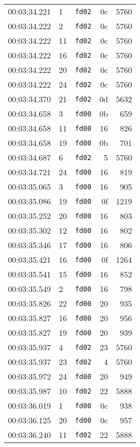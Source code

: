 \documentclass{article}
\begin{document}
\begin{longtable}{lllrr}
00:03:34.221 & 1 & \texttt{fd02} & 0c & 5760 \\
00:03:34.222 & 2 & \texttt{fd02} & 0c & 5760 \\
00:03:34.222 & 11 & \texttt{fd02} & 0c & 5760 \\
00:03:34.222 & 16 & \texttt{fd02} & 0c & 5760 \\
00:03:34.222 & 20 & \texttt{fd02} & 0c & 5760 \\
00:03:34.222 & 24 & \texttt{fd02} & 0c & 5760 \\
00:03:34.370 & 21 & \texttt{fd02} & 0d & 5632 \\
00:03:34.658 & 3 & \texttt{fd00} & 0b & 659 \\
00:03:34.658 & 11 & \texttt{fd00} & 16 & 826 \\
00:03:34.658 & 19 & \texttt{fd00} & 0b & 701 \\
00:03:34.687 & 6 & \texttt{fd02} & 5 & 5760 \\
00:03:34.721 & 24 & \texttt{fd00} & 16 & 819 \\
00:03:35.065 & 3 & \texttt{fd00} & 16 & 905 \\
00:03:35.086 & 19 & \texttt{fd00} & 0f & 1219 \\
00:03:35.252 & 20 & \texttt{fd00} & 16 & 803 \\
00:03:35.302 & 12 & \texttt{fd00} & 16 & 802 \\
00:03:35.346 & 17 & \texttt{fd00} & 16 & 806 \\
00:03:35.421 & 16 & \texttt{fd00} & 0f & 1264 \\
00:03:35.541 & 15 & \texttt{fd00} & 16 & 852 \\
00:03:35.549 & 2 & \texttt{fd00} & 16 & 798 \\
00:03:35.826 & 22 & \texttt{fd00} & 20 & 935 \\
00:03:35.827 & 16 & \texttt{fd00} & 20 & 956 \\
00:03:35.827 & 19 & \texttt{fd00} & 20 & 939 \\
00:03:35.937 & 4 & \texttt{fd02} & 23 & 5760 \\
00:03:35.937 & 23 & \texttt{fd02} & 4 & 5760 \\
00:03:35.972 & 24 & \texttt{fd00} & 20 & 949 \\
00:03:35.987 & 10 & \texttt{fd02} & 22 & 5888 \\
00:03:36.019 & 1 & \texttt{fd00} & 0c & 938 \\
00:03:36.125 & 20 & \texttt{fd00} & 0c & 957 \\
00:03:36.240 & 11 & \texttt{fd02} & 22 & 5888 \\

\end{longtable}
\end{document}
